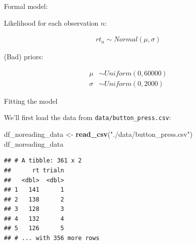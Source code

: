 \documentclass[12pt,ignorenonframetext,aspectratio=169]{beamer}
\newenvironment{Shaded}{\begin{snugshade}}{\end{snugshade}}
\newcommand{\KeywordTok}[1]{\textcolor[rgb]{0.13,0.29,0.53}{\textbf{#1}}}
\newcommand{\NormalTok}[1]{#1}
\newcommand{\StringTok}[1]{\textcolor[rgb]{0.31,0.60,0.02}{#1}}
\begin{document}
\begin{frame}{Formal model:}
\protect\hypertarget{formal-model}{}

\begin{block}{Likelihood for each observation \(n\):}

\begin{equation}
\begin{aligned}
rt_n \sim Normal(\mu, \sigma)
\end{aligned}
\label{eq:rtlik}
\end{equation}

\end{block}

\begin{block}{(Bad) priors:}

\begin{equation}
\begin{aligned}
\mu &\sim Uniform(0, 60000) \\
\sigma &\sim Uniform(0, 2000) 
\end{aligned}
\label{eq:rtpriors}
\end{equation}

\end{block}

\end{frame}

\begin{frame}[fragile]{Fitting the model}
\protect\hypertarget{fitting-the-model}{}

We'll first load the data from \texttt{data/button\_press.csv}:

\small

\begin{Shaded}
\begin{Highlighting}[]
\NormalTok{df_noreading_data <-}
\StringTok{  }\KeywordTok{read_csv}\NormalTok{(}\StringTok{"./data/button_press.csv"}\NormalTok{)}
\NormalTok{df_noreading_data}
\end{Highlighting}
\end{Shaded}

\begin{verbatim}
## # A tibble: 361 x 2
##      rt trialn
##   <dbl>  <dbl>
## 1   141      1
## 2   138      2
## 3   128      3
## 4   132      4
## 5   126      5
## # ... with 356 more rows
\end{verbatim}

\normalsize

\end{frame}
\end{document}
